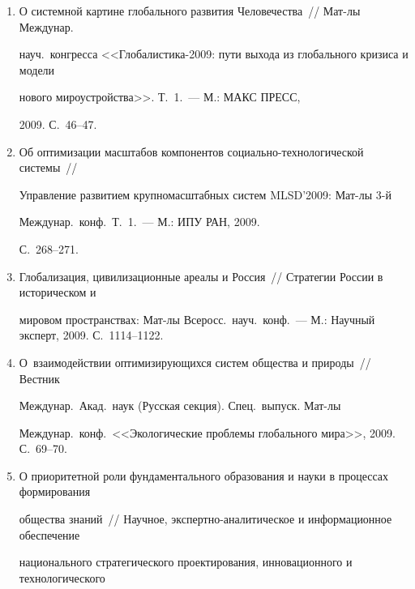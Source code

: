 \begin{enumerate}[1.]
\item {}


О системной картине глобального развития Человечества~// Мат-лы Междунар.\ 


науч.\ кон\-грес\-са <<Гло\-ба\-лис\-ти\-ка-2009: пути выхода из глобального кризиса и модели 


нового мироустройства>>. Т.~1.~--- М.: МАКС ПРЕСС, 


2009. С.~46--47.





\item {}


Об оптимизации масштабов компонентов социально-технологической системы~// 


Управление развитием крупномасштабных систем MLSD'2009: Мат-лы 3-й 


Междунар.\ конф.\ Т.~1.~--- М.: ИПУ РАН, 2009. 


С.~268--271.





\item {}


Глобализация, цивилизационные ареалы и Россия~// Стратегии России в историческом и 


мировом пространствах: Мат-лы Всеросс.\ науч.\ конф.~--- М.: Научный эксперт, 2009. С.~1114--1122.





\item {}


О~взаимодействии оптимизирующихся систем общества и природы~// Вестник 


Междунар.\ Акад.\ наук (Русская секция). Спец.\ выпуск. Мат-лы 


Междунар.\ конф.\ <<Экологические проблемы глобального мира>>, 2009. С.~69--70.





\item {}


О приоритетной роли фундаментального образования и науки в процессах формирования 


общества знаний~// Научное, экспертно-аналитическое и информационное обеспечение 


национального стратегического проектирования, инновационного и технологического 



\end{enumerate}
